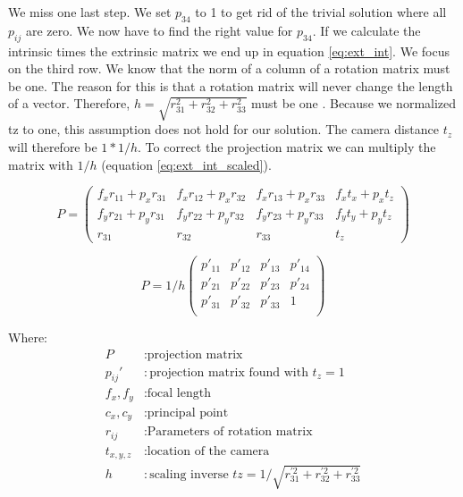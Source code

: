 \documentclass[11pt,a4paper,titlepage,oneside]{report}
\begin{document}
We miss one last step. We set $p_{34}$ to 1 to get rid of the trivial solution where all $p_{ij}$ are zero. We now have to find the right value for $p_{34}$. If we calculate the intrinsic times the extrinsic matrix we end up in equation \ref{eq:ext_int}. We focus on the third row. We know that the norm of a column of a rotation matrix must be one. The reason for this is that a rotation matrix will never change the length of a vector. Therefore, $h=\sqrt{r_{31}^2+r_{32}^2+r_{33}^2}$ must be one \cite{Wu}. Because we normalized tz to one, this assumption does not hold for our solution. The camera distance $t_z$ will therefore be $1*1/h$. To correct the projection matrix we can multiply the matrix with $1/h$ (equation \ref{eq:ext_int_scaled}).

\begin{equation}\label{eq:ext_int}
	P=
	\begin{pmatrix}
		f_xr_{11}+p_xr_{31} & f_xr_{12}+p_xr_{32} & f_xr_{13}+p_xr_{33} & f_xt_x+p_xt_z\\
		f_yr_{21}+p_yr_{31} & f_yr_{22}+p_yr_{32} & f_yr_{23}+p_yr_{33} & f_yt_y+p_yt_z\\
		r_{31} & r_{32} & r_{33} & t_z
	\end{pmatrix}
\end{equation}

\begin{equation}\label{eq:ext_int_scaled}
	P=1/h
	\begin{pmatrix}
		p'_{11} & p'_{12} & p'_{13} & p'_{14}\\
		p'_{21} & p'_{22} & p'_{23} & p'_{24}\\
		p'_{31} & p'_{32} & p'_{33} & 1\\
	\end{pmatrix}
\end{equation}

Where:
\begin{align*}
	P					&: \text{projection matrix}\\
	p_{ij}'		&: \text{projection matrix found with $t_z=1$}\\
	f_x,f_y		&: \text{focal length}\\
	c_x,c_y		&: \text{principal point}\\
	r_{ij}		&: \text{Parameters of rotation matrix}\\
	t_{x,y,z}	&: \text{location of the camera}\\
	h					&: \text{scaling inverse $tz=1/\sqrt{r_{31}^{'2}+r_{32}^{'2}+r_{33}^{'2}}$}
\end{align*}
\end{document}
